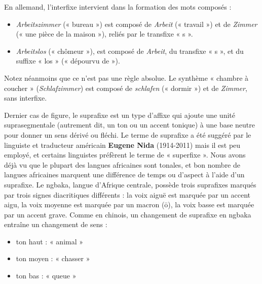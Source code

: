 En allemand, l’interfixe intervient dans la formation des mots composés :
\begin{itemize}
\item \textit{Arbeitszimmer} (« bureau ») est composé de \textit{Arbeit} (« travail ») et de \textit{Zimmer} (« une pièce de la maison »), reliés par le transfixe « s ».
\item \textit{Arbeitslos} (« chômeur »), est composé de \textit{Arbeit}, du transfixe « s », et du suffixe « los » (« dépourvu de »).
\end{itemize}
Notez néanmoins que ce n’est pas une règle absolue. Le synthème « chambre à coucher » (\textit{Schlafzimmer}) est composé de \textit{schlafen} (« dormir ») et de \textit{Zimmer}, sans interfixe.

Dernier cas de figure, le suprafixe est un type d’affixe qui ajoute une unité suprasegmentale (autrement dit, un ton ou un accent tonique) à une base neutre pour donner un sens dérivé ou fléchi. Le terme de suprafixe a été suggéré par le linguiste et traducteur américain \textbf{Eugene Nida} (1914-2011) mais il est peu employé, et certains linguistes préfèrent le terme de « superfixe ». Nous avons déjà vu que le plupart des langues africaines sont tonales, et bon nombre de langues africaines marquent une différence de temps ou d’aspect à l’aide d’un suprafixe. Le ngbaka, langue d’Afrique centrale, possède trois suprafixes marqués par trois signes diacritiques différents : la voix aiguë est marquée par un accent aigu, la voix moyenne est marquée par un macron (ō), la voix basse est marquée par un accent grave. Comme en chinois, un changement de suprafixe en ngbaka entraîne un changement de sens :
\begin{itemize}
\item {} ton haut : « animal »
\item {} ton moyen : « chasser »
\item {} ton bas : « queue »
\end{itemize}


